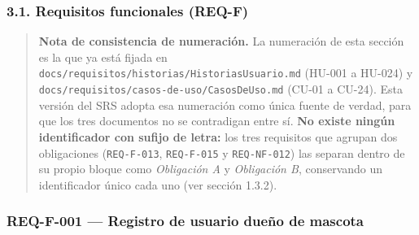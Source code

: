 \documentclass[
  spanish,
]{article}
\begin{document}
\subsubsection{3.1. Requisitos funcionales
(REQ-F)}\label{requisitos-funcionales-req-f}

\begin{quote}
\textbf{Nota de consistencia de numeración.} La numeración de esta
sección es la que ya está fijada en
\texttt{docs/\allowbreak{}requisitos/\allowbreak{}historias/\allowbreak{}Historias\allowbreak{}Usuario.\allowbreak{}md} (HU-001 a HU-024)
y \texttt{docs/\allowbreak{}requisitos/\allowbreak{}casos-\allowbreak{}de-\allowbreak{}uso/\allowbreak{}Casos\allowbreak{}De\allowbreak{}Uso.\allowbreak{}md} (CU-01 a CU-24).
Esta versión del SRS adopta esa numeración como única fuente de verdad,
para que los tres documentos no se contradigan entre sí. \textbf{No
existe ningún identificador con sufijo de letra:} los tres requisitos
que agrupan dos obligaciones (\texttt{REQ-\allowbreak{}F-\allowbreak{}013}, \texttt{REQ-\allowbreak{}F-\allowbreak{}015} y
\texttt{REQ-\allowbreak{}NF-\allowbreak{}012}) las separan dentro de su propio bloque como
\emph{Obligación A} y \emph{Obligación B}, conservando un identificador
único cada uno (ver sección 1.3.2).
\end{quote}

\subsubsection{REQ-F-001 --- Registro de usuario dueño de
mascota}\label{req-f-001-registro-de-usuario-dueuxf1o-de-mascota}
\end{document}
